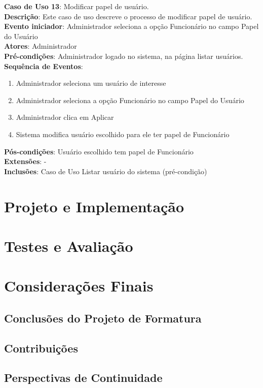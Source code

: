 \documentclass[]{politex}
\begin{document}
\noindent \textbf{Caso de Uso 13}: Modificar papel de usuário. \\
\textbf{Descrição}: Este caso de uso descreve o processo de modificar papel de
usuário. \\
\textbf{Evento iniciador}: Administrador seleciona a opção Funcionário no campo
Papel do Usuário \\
\textbf{Atores}: Administrador \\
\textbf{Pré-condições}: Administrador logado no sistema, na página listar
usuários. \\
\textbf{Sequência de Eventos}:
\begin{enumerate}
\item Administrador seleciona um usuário de interesse
\item Administrador seleciona a opção Funcionário no campo Papel do Usuário
\item Administrador clica em Aplicar
\item Sistema modifica usuário escolhido para ele ter papel de Funcionário
\end{enumerate}
\textbf{Pós-condições}: Usuário escolhido tem papel de Funcionário \\
\textbf{Extensões}: - \\
\textbf{Inclusões}: Caso de Uso Listar usuário do sistema (pré-condição) \\

\chapter{Projeto e Implementação}

\chapter{Testes e Avaliação}

\chapter{Considerações Finais}
\section{Conclusões do Projeto de Formatura}
\section{Contribuições}
\section{Perspectivas de Continuidade}
\end{document}
